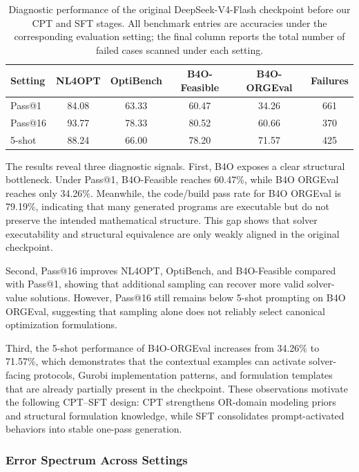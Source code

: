 \begin{table}[t]
\centering
\small
\caption{Diagnostic performance of the original DeepSeek-V4-Flash checkpoint
before our CPT and SFT stages. All benchmark entries are accuracies under the
corresponding evaluation setting; the final column reports the total number of
failed cases scanned under each setting.}
\label{tab:original_checkpoint_diagnosis}
\begin{tabular}{lccccc}
\toprule
Setting & NL4OPT & OptiBench & B4O-Feasible & B4O-ORGEval & Failures \\
\midrule
Pass@1  & 84.08 & 63.33 & 60.47 & 34.26 & 661 \\
Pass@16 & 93.77 & 78.33 & 80.52 & 60.66 & 370 \\
5-shot  & 88.24 & 66.00 & 78.20 & 71.57 & 425 \\
\bottomrule
\end{tabular}
\end{table}

The results reveal three diagnostic signals. First, B4O exposes a clear
structural bottleneck. Under Pass@1, B4O-Feasible reaches 60.47\%, while B4O
ORGEval reaches only 34.26\%. Meanwhile, the code/build pass rate for B4O
ORGEval is 79.19\%, indicating that many generated programs are executable but
do not preserve the intended mathematical structure. This gap shows that
solver executability and structural equivalence are only weakly aligned in the
original checkpoint.

Second, Pass@16 improves NL4OPT, OptiBench, and B4O-Feasible compared with
Pass@1, showing that additional sampling can recover more valid solver-value
solutions. However, Pass@16 still remains below 5-shot prompting on B4O
ORGEval, suggesting that sampling alone does not reliably select canonical
optimization formulations.

Third, the 5-shot performance of B4O-ORGEval increases from 34.26\% to 71.57\%, which demonstrates that the contextual examples can activate solver-facing
protocols, Gurobi implementation patterns, and formulation templates that are
already partially present in the checkpoint. These observations motivate the
following CPT--SFT design: CPT strengthens OR-domain modeling priors and
structural formulation knowledge, while SFT consolidates prompt-activated
behaviors into stable one-pass generation.

\subsubsection{Error Spectrum Across Settings}

